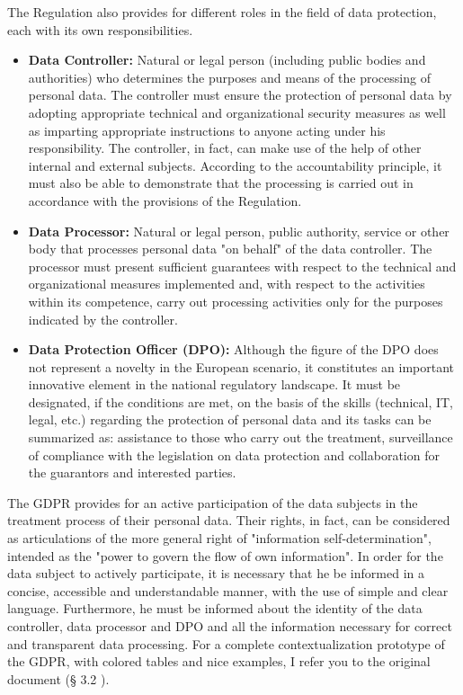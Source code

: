 The Regulation also provides for different roles in the field of data protection, each with its own responsibilities.
\begin{itemize}
    \item \textbf{Data Controller:} Natural or legal person (including public bodies and authorities) who determines the purposes and means of the processing of personal data. The controller must ensure the protection of personal data by adopting appropriate technical and organizational security measures as well as imparting appropriate instructions to anyone acting under his responsibility. The controller, in fact, can make use of the help of other internal and external subjects. According to the accountability principle, it must also be able to demonstrate that the processing is carried out in accordance with the provisions of the Regulation.
    \item \textbf{Data Processor:} Natural or legal person, public authority, service or other body that processes personal data "on behalf" of the data controller. The processor must present sufficient guarantees with respect to the technical and organizational measures implemented and, with respect to the activities within its competence, carry out processing activities only for the purposes indicated by the controller.
    \item \textbf{Data Protection Officer (DPO):} Although the figure of the DPO does not represent a novelty in the European scenario, it constitutes an important innovative element in the national regulatory landscape. It must be designated, if the conditions are met, on the basis of the skills (technical, IT, legal, etc.) regarding the protection of personal data and its tasks can be summarized as: assistance to those who carry out the treatment, surveillance of compliance with the legislation on data protection and collaboration for the guarantors and interested parties.
\end{itemize}
The GDPR provides for an active participation of the data subjects in the treatment process of their personal data. Their rights, in fact, can be considered as articulations of the more general right of "information self-determination", intended as the "power to govern the flow of own information". In order for the data subject to actively participate, it is necessary that he be informed in a concise, accessible and understandable manner, with the use of simple and clear language. Furthermore, he must be informed about the identity of the data controller, data processor and DPO and all the information necessary for correct and transparent data processing. For a complete contextualization prototype of the GDPR, with colored tables and nice examples, I refer you to the original document (§ 3.2 \cite{CISSAP2019}).
